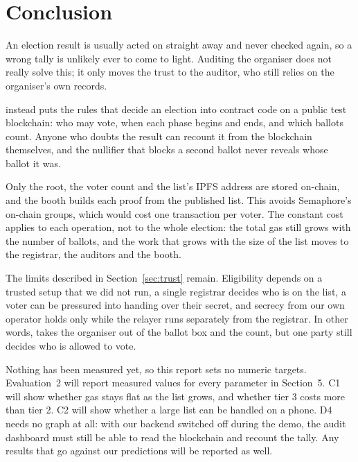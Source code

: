 \section{Conclusion}

An election result is usually acted on straight away and never checked again,
so a wrong tally is unlikely ever to come to light. Auditing the organiser does
not really solve this; it only moves the trust to the auditor, who still relies
on the organiser's own records.

\projectname{} instead puts the rules that decide an election into contract
code on a public test blockchain: who may vote, when each phase begins and
ends, and which ballots count. Anyone who doubts the result can recount it from
the blockchain themselves, and the nullifier that blocks a second ballot never
reveals whose ballot it was.

Only the root, the voter count and the list's IPFS address are stored on-chain,
and the booth builds each proof from the published list. This avoids
Semaphore's on-chain groups, which would cost one transaction per voter. The
constant cost applies to each operation, not to the whole election: the total
gas still grows with the number of ballots, and the work that grows with the
size of the list moves to the registrar, the auditors and the booth.

The limits described in Section~\ref{sec:trust} remain. Eligibility depends on
a trusted setup that we did not run, a single registrar decides who is on the
list, a voter can be pressured into handing over their secret, and secrecy
from our own operator holds only while the relayer runs separately from the
registrar. In other words, \projectname{} takes the organiser out of the ballot
box and the count, but one party still decides who is allowed to vote.

Nothing has been measured yet, so this report sets no numeric targets.
Evaluation~2 will report measured values for every parameter in Section~5. C1
will show whether gas stays flat as the list grows, and whether tier 3 costs
more than tier 2. C2 will show whether a large list can be handled on a phone.
D4 needs no graph at all: with our backend switched off during the demo, the
audit dashboard must still be able to read the blockchain and recount the
tally. Any results that go against our predictions will be reported as well.
